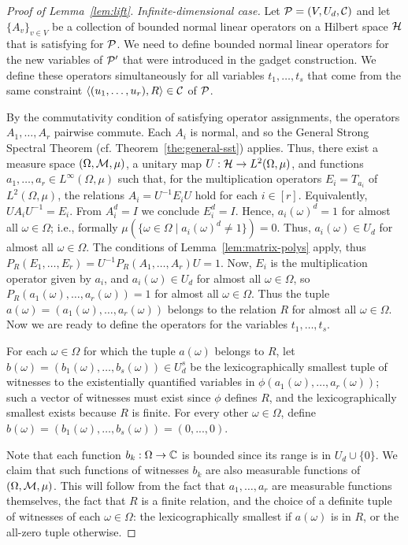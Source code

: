 \documentclass[11pt,letter]{article}
\begin{document}
\begin{proof}[Proof of Lemma~\ref{lem:lift}]
\smallskip

{\it Infinite-dimensional case.}
Let ${\mathcal P}=(V,U_d,{\mathcal C})$ and let $\{A_v\}_{v\in V}$ be a collection of bounded
  normal linear operators on a Hilbert space ${\mathcal H}$ that is satisfying for ${\mathcal P}$. We need to define bounded
normal linear operators for the new variables of ${\mathcal P}'$ that were introduced in
  the gadget construction. We define these operators
simultaneously for all variables $t_1,\dots,t_s$ that come from the same constraint $\langle (u_1,\ldots,u_r),R \rangle\in{\mathcal C}$ of ${\mathcal P}$.

By the commutativity condition of satisfying operator assignments, the operators
  $A_1,\dots,A_r$ pairwise commute. Each $A_i$ is normal, and so the General Strong Spectral Theorem (cf. Theorem~\ref{the:general-sst}) applies.
Thus, there exist a measure space $(\Omega,{\mathcal M},\mu)$, a unitary map $U:{\mathcal H}\to L^2(\Omega,\mu)$, and functions $a_1,\dots,a_r\in L^\infty(\Omega,\mu)$ such
that, for the multiplication operators $E_i = T_{a_i}$ of $L^2(\Omega,\mu)$, the relations $A_i = U^{-1} E_iU$ hold for each $i\in [r]$. Equivalently,
$U A_iU^{-1} = E_i$. From $A_i^d=I$ we conclude $E_i^d=I$. Hence, $a_i(\omega)^d = 1$ for almost all $\omega\in\Omega$; i.e., formally $\mu(\{\omega\in\Omega\mid a_i(\omega)^d\ne1\}) = 0$. Thus, $a_i(\omega)\in U_d$ for almost all $\omega\in\Omega$. The conditions of Lemma~\ref{lem:matrix-polys} apply, thus $P_R(E_1,\dots, E_r)=U^{-1}P_R (A_1,\dots, A_r)U=1$. Now, $E_i$ is the multiplication operator given by $a_i$, and $a_i(\omega)\in U_d$ for almost all $\omega\in\Omega$, so $P_R (a_1(\omega),\dots,a_r(\omega)) = 1$ for almost all $\omega\in\Omega$. Thus the tuple $a(\omega) = (a_1(\omega),\dots,a_r(\omega))$ belongs to the relation
$R$ for almost all $\omega\in\Omega$. Now we are ready to define the operators for the variables $t_1,\dots,t_s$.

For each $\omega\in\Omega$ for which the tuple $a(\omega)$ belongs to $R$, let $b(\omega) = (b_1(\omega),\dots, b_s(\omega))\in U_d^s$ be the lexicographically
smallest tuple of witnesses to the existentially quantified variables in $\phi(a_1(\omega),\dots, a_r(\omega))$; such a vector of witnesses
must exist since $\phi$ defines $R$, and the lexicographically smallest exists because $R$ is finite. For every other $\omega\in\Omega$, define
$b(\omega) = (b_1(\omega),\dots, b_s(\omega)) = (0,..., 0)$.

Note that each function $b_k:\Omega\to{\mathbb C}$ is bounded since its range is in $U_d\cup\{0\}$. We claim that such functions of witnesses
$b_k$ are also measurable functions of $(\Omega,{\mathcal M},\mu)$. This will follow from the fact that $a_1,\dots,a_r$ are measurable functions themselves, the fact that $R$ is a finite relation, and the choice of a definite tuple of witnesses of each $\omega\in\Omega$: the lexicographically
smallest if $a(\omega)$ is in $R$, or the all-zero tuple otherwise. 


\end{proof}
\end{document}

